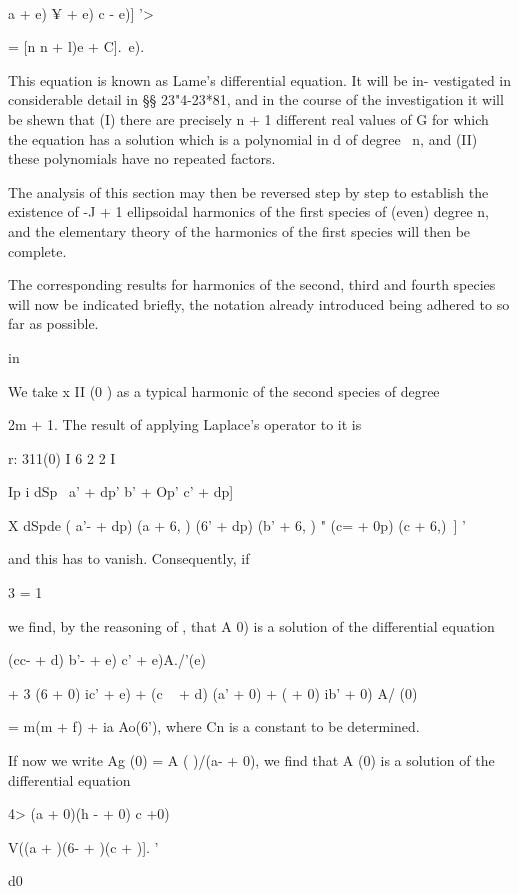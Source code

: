  \ \ {a + e) ¥ + e) c - e)] '>

= [n n + l)e + C].\, e).

This equation is known as Lame's differential equation. It will be in-
vestigated in considerable detail in §§ 23"4-23*81, and in the course
of the investigation it will be shewn that (I) there are precisely n +
1 different real values of G for which the equation has a solution
which is a polynomial in d of degree \ n, and (II) these polynomials
have no repeated factors.

The analysis of this section may then be reversed step by step to
establish the existence of -J + 1 ellipsoidal harmonics of the first
species of (even) degree n, and the elementary theory of the harmonics
of the first species will then be complete.

The corresponding results for harmonics of the second, third and
fourth species will now be indicated briefly, the notation already
introduced being adhered to so far as possible.


in

We take x II (0 ) as a typical harmonic of the second species of
degree

2m + 1. The result of applying Laplace's operator to it is

r: 311(0) I 6 2 2 I

 Ip i dSp \ a' + dp' b' + Op' c' + dp]

   X dSpde ( a'- + dp) (a + 6, ) (6' + dp) (b' + 6, ) " (c= + 0p) (c +
6,)\ ] '

%
%

and this has to vanish. Consequently, if

3 = 1

we find, by the reasoning of , that A 0) is a solution of the
differential equation

(cc- + d) b'- + e) c' + e)A./'(e)

+ 3 (6 + 0) ic' + e) + (c ~ + d) (a' + 0) + ( + 0) ib' + 0) A/ (0)

= m(m + f) + ia Ao(6'), where Cn is a constant to be determined.

If now we write Ag (0) = A ( )/\/(a- + 0), we find that A (0) is a
solution of the differential equation

4> (a + 0)(h - + 0) c +0)

V((a + )(6- + )(c + )]. '

d0

}
